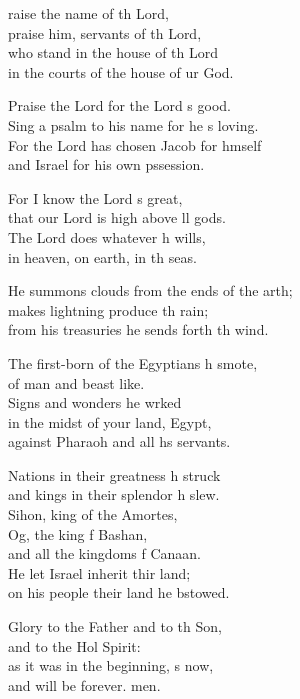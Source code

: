 \settowidth{\versewidth}{He summons clouds from the ends of the earth; +}
\begin{psalmverse}%
  \begin{patverse}
raise the name of th Lord,\Med\\
praise him, servants of th Lord,\\
who stand in the house of th Lord\Med\\
in the courts of the house of ur God.

Praise the Lord for the Lord \pointup{\i}s good.\Med\\
Sing a psalm to his name for he \pointup{\i}s loving.\\
For the Lord has chosen Jacob for h\pointup{\i}mself\Med\\
and Israel for his own pssession.

For I know the Lord \pointup{\i}s great,\Med\\
that our Lord is high above ll gods.\\
The Lord does whatever h wills,\Med\\
in heaven, on earth, in th seas.

He summons clouds from the ends of the arth;\Flex\\
makes lightning produce th rain;\Med\\
from his treasuries he sends forth th wind.

The first-born of the Egyptians h smote,\Med\\
of man and beast like.\\
Signs and wonders he wrked\Flex\\
in the midst of your land,  Egypt,\Med\\
against Pharaoh and all h\pointup{\i}s servants.

Nations in their greatness h struck\Med\\
and kings in their splendor h slew.\\
Sihon, king of the Amor\pointup{\i}tes,\Flex\\
Og, the king f Bashan,\Med\\
and all the kingdoms f Canaan.\\
He let Israel inherit thir land;\Med\\
on his people their land he bstowed.

Glory to the Father and to th Son,\Med\\
and to the Hol Spirit:\\
as it was in the beginning, \pointup{\i}s now,\Med\\
and will be forever. men.
  \end{patverse}
\end{psalmverse}

